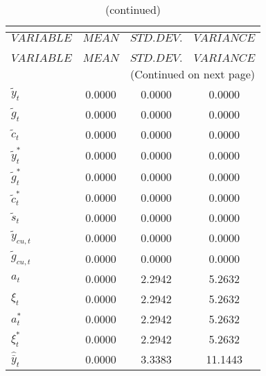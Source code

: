  
\begin{center}
\begin{longtable}{lccc} 
\caption{THEORETICAL MOMENTS}\\
 \label{Table:th_moments}\\
\toprule 
$VARIABLE             $	 & 	 $         MEAN$	 & 	 $    STD. DEV.$	 & 	 $     VARIANCE$\\
\midrule \endfirsthead 
\caption{(continued)}\\
 \toprule \\ 
$VARIABLE             $	 & 	 $         MEAN$	 & 	 $    STD. DEV.$	 & 	 $     VARIANCE$\\
\midrule \endhead 
\midrule \multicolumn{4}{r}{(Continued on next page)} \\ \bottomrule \endfoot 
\bottomrule \endlastfoot 
${\tilde y_t}         $	 & 	       0.0000	 & 	       0.0000	 & 	       0.0000 \\ 
${\tilde g_t}         $	 & 	       0.0000	 & 	       0.0000	 & 	       0.0000 \\ 
${\tilde c_t}         $	 & 	       0.0000	 & 	       0.0000	 & 	       0.0000 \\ 
${\tilde y_t^*}       $	 & 	       0.0000	 & 	       0.0000	 & 	       0.0000 \\ 
${\tilde g_t^*}       $	 & 	       0.0000	 & 	       0.0000	 & 	       0.0000 \\ 
${\tilde c_t^*}       $	 & 	       0.0000	 & 	       0.0000	 & 	       0.0000 \\ 
${\tilde s_t}         $	 & 	       0.0000	 & 	       0.0000	 & 	       0.0000 \\ 
${\tilde y_{cu,t}}    $	 & 	       0.0000	 & 	       0.0000	 & 	       0.0000 \\ 
${\tilde g_{cu,t}}    $	 & 	       0.0000	 & 	       0.0000	 & 	       0.0000 \\ 
${a_t}                $	 & 	       0.0000	 & 	       2.2942	 & 	       5.2632 \\ 
${\xi_t}              $	 & 	       0.0000	 & 	       2.2942	 & 	       5.2632 \\ 
${a_t^*}              $	 & 	       0.0000	 & 	       2.2942	 & 	       5.2632 \\ 
${\xi_t^*}            $	 & 	       0.0000	 & 	       2.2942	 & 	       5.2632 \\ 
${\hat {\bar y}_t}    $	 & 	       0.0000	 & 	       3.3383	 & 	      11.1443 \\ 

\end{longtable}
\end{center}

